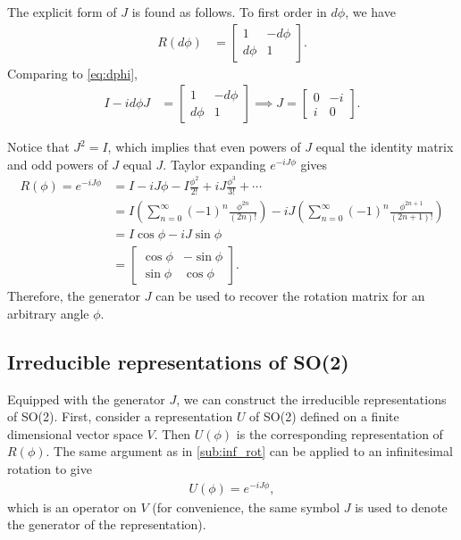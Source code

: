 The explicit form of $J$ is found as follows. To first order in $d\phi$, we have
\begin{align*}
    R(d\phi) &= \begin{bmatrix}
        1 & -d\phi \\
        d\phi & 1
    \end{bmatrix}.
\end{align*}
Comparing to \cref{eq:dphi},
\begin{align*}
    I - i d\phi J &= \begin{bmatrix}
        1 & -d\phi \\
        d\phi & 1
    \end{bmatrix} \implies J = \begin{bmatrix}
        0 & -i \\
        i & 0
    \end{bmatrix}.
\end{align*}

Notice that $J^2 = I$, which implies that even powers of $J$ equal the identity matrix and odd powers of $J$ equal $J$. Taylor expanding $e^{-iJ\phi }$ gives
\begin{align*}
    R(\phi) = e^{-iJ\phi} &= I - iJ\phi - I \frac{\phi^2}{2!} + iJ\frac{\phi^3}{3!} + \cdots \\
    &= I\left( \sum_{n=0}^{\infty} {(-1)}^n \frac{\phi^{2n}}{(2n)!} \right) - iJ\left( \sum_{n=0}^{\infty} {(-1)}^n \frac{\phi^{2n+1}}{(2n+1)!} \right) \\
    &= I\cos\phi - iJ\sin\phi \\
    &= \begin{bmatrix}
        \cos\phi & -\sin\phi \\
        \sin\phi & \cos\phi
    \end{bmatrix}.
\end{align*}
Therefore, the generator $J$ can be used to recover the rotation matrix for an arbitrary angle $\phi$.

\subsection{Irreducible representations of SO(2)}\label{sub:irr_so2}

Equipped with the generator $J$, we can construct the irreducible representations of SO(2). First, consider a representation $U$ of SO(2) defined on a finite dimensional vector space $V$. Then $U(\phi)$ is the corresponding representation of $R(\phi)$. The same argument as in \cref{sub:inf_rot} can be applied to an infinitesimal rotation to give
\begin{align*}
    U(\phi) = e^{-iJ\phi},
\end{align*}
which is an operator on $V$ (for convenience, the same symbol $J$ is used to denote the generator of the representation).

